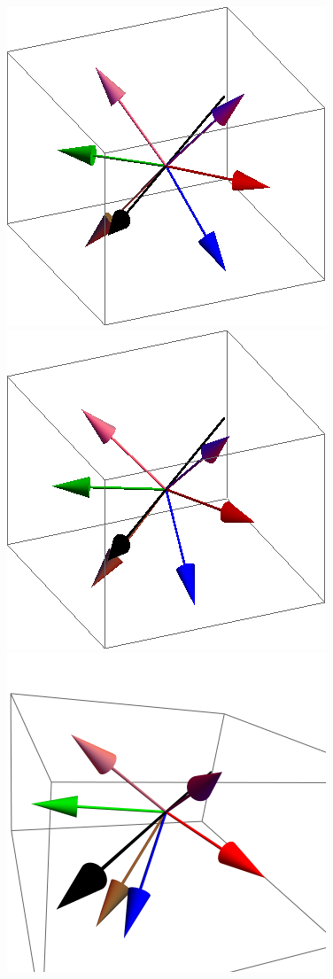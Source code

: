 \documentclass{article}
\begin{document}
\begin{figure}[ht]
\includegraphics[scale=0.28]{110/96S000to005G.png}
\includegraphics[scale=0.28]{110/501S000to005G.png}
\includegraphics[scale=0.28]{HVariedData/Pictures/110Inc40S.png}

\end{figure}
\end{document}
